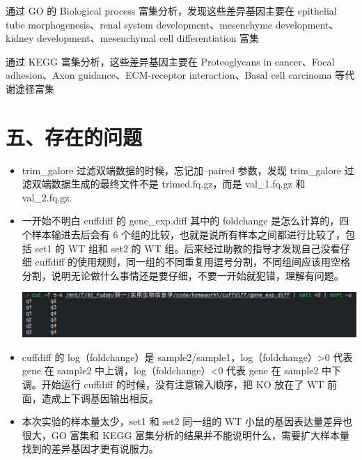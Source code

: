 \documentclass[
  a4paper,
]{article}
\begin{document}
通过 GO 的 Biological process 富集分析，发现这些差异基因主要在
epithelial tube morphogenesis、renal system development、mesenchyme
development、kidney development、mesenchymal cell differentiation 富集

通过 KEGG 富集分析，这些差异基因主要在 Proteoglycans in cancer、Focal
adhesion、Axon guidance、ECM-receptor interaction、Basal cell carcinoma
等代谢途径富集

\hypertarget{ux4e94ux5b58ux5728ux7684ux95eeux9898}{%
\section{五、存在的问题}\label{ux4e94ux5b58ux5728ux7684ux95eeux9898}}

\begin{itemize}
\item
  trim\_galore 过滤双端数据的时候，忘记加--paired 参数，发现
  trim\_galore 过滤双端数据生成的最终文件不是 trimed.fq.gz，而是
  val\_1.fq.gz 和 val\_2.fq.gz.
\item
  一开始不明白 cuffdiff 的 gene\_exp.diff 其中的 foldchange
  是怎么计算的，四个样本输进去后会有 6
  个组的比较，也就是说所有样本之间都进行比较了，包括 set1 的 WT 组和
  set2 的 WT 组。后来经过助教的指导才发现自己没看仔细 cuffdiff
  的使用规则，同一组的不同重复用逗号分割，不同组间应该用空格分割，说明无论做什么事情还是要仔细，不要一开始就犯错，理解有问题。

  \includegraphics{assets/image-20221003224834-2o60cnv.png}\hspace{0pt}\hspace{0pt}
\item
  cuffdiff 的 log（foldchange）是
  sample2/sample1，log（foldchange）\textgreater0 代表 gene 在 sample2
  中上调，log（foldchange）\textless0 代表 gene 在 sample2
  中下调。开始运行 cuffdiff 的时候，没有注意输入顺序，把 KO 放在了 WT
  前面，造成上下调基因输出相反。
\item
  本次实验的样本量太少，set1 和 set2 同一组的 WT
  小鼠的基因表达量差异也很大，GO 富集和 KEGG
  富集分析的结果并不能说明什么，需要扩大样本量找到的差异基因才更有说服力。
\end{itemize}

‍


\printbibliography[title=References]
\end{document}

